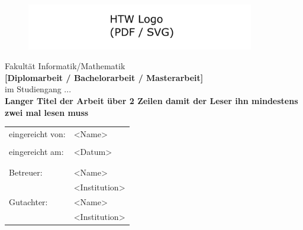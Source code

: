 \begin{titlepage}
	\pagestyle{empty}
	\begin{center}
		\begin{figure}
			\includegraphics[height=2cm]{img/Htw-dresden-logo}
			\centering
		\end{figure}
		{\large Fakultät Informatik/Mathematik \\[3cm]}
		{\Large\bf [Diplomarbeit / Bachelorarbeit / Masterarbeit]\\[1.5cm]}
		{im Studiengang ... \\[3cm]}
	    {\large\bf  Langer Titel der Arbeit über 2 Zeilen damit der Leser ihn mindestens zwei mal lesen muss  \\[3.5 cm]}
	\end{center}
	\begin{tabular}{ll} eingereicht von: & <Name>
		\tabularnewline  & 
		\tabularnewline eingereicht am: & <Datum>
		\tabularnewline  &
		\tabularnewline  & 
		\tabularnewline Betreuer: &  <Name>
		\tabularnewline  & <Institution>
		\tabularnewline Gutachter: & <Name>
		\tabularnewline  & <Institution>
	\end{tabular}
\end{titlepage}